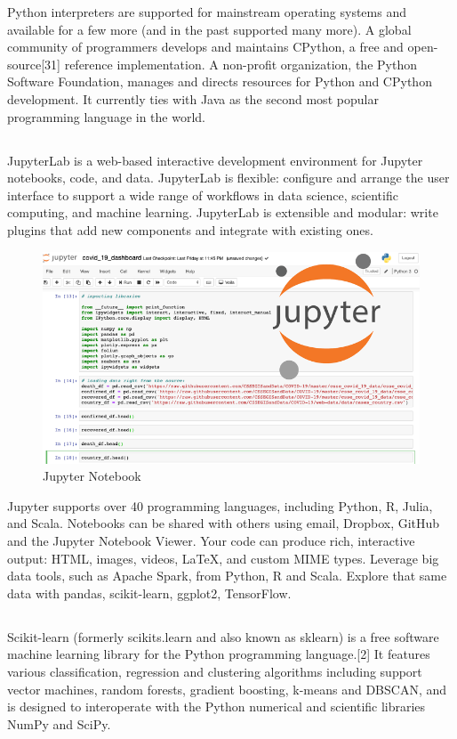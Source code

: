 \documentclass[12pt]{article}
\newcommand{\msize}{\fontsize{14pt}{12pt}\selectfont}
\begin{document}
Python interpreters are supported for mainstream operating systems and available for a few more (and in the past supported many more). A global community of programmers develops and maintains CPython, a free and open-source[31] reference implementation. A non-profit organization, the Python Software Foundation, manages and directs resources for Python and CPython development. It currently ties with Java as the second most popular programming language in the world.
\newpage
\subsection{\msize{\textbf{JUPYTER NOTEBOOK}}}
JupyterLab is a web-based interactive development environment for Jupyter notebooks, code, and data. JupyterLab is flexible: configure and arrange the user interface to support a wide range of workflows in data science, scientific computing, and machine learning. JupyterLab is extensible and modular: write plugins that add new components and integrate with existing ones.

\begin{center}
\begin{figure}[h]
\centerline{\includegraphics[scale=.5]{IMG_8209.png}}
\caption{Jupyter Notebook}
\end{figure}
\end{center}

Jupyter supports over 40 programming languages, including Python, R, Julia, and Scala. Notebooks can be shared with others using email, Dropbox, GitHub and the Jupyter Notebook Viewer. Your code can produce rich, interactive output: HTML, images, videos, LaTeX, and custom MIME types. Leverage big data tools, such as Apache Spark, from Python, R and Scala. Explore that same data with pandas, scikit-learn, ggplot2, TensorFlow.
\newpage
\subsection{\msize{\textbf{SCIKIT LEARN }}}
Scikit-learn (formerly scikits.learn and also known as sklearn) is a free software machine learning library for the Python programming language.[2] It features various classification, regression and clustering algorithms including support vector machines, random forests, gradient boosting, k-means and DBSCAN, and is designed to interoperate with the Python numerical and scientific libraries NumPy and SciPy.
\end{document}
